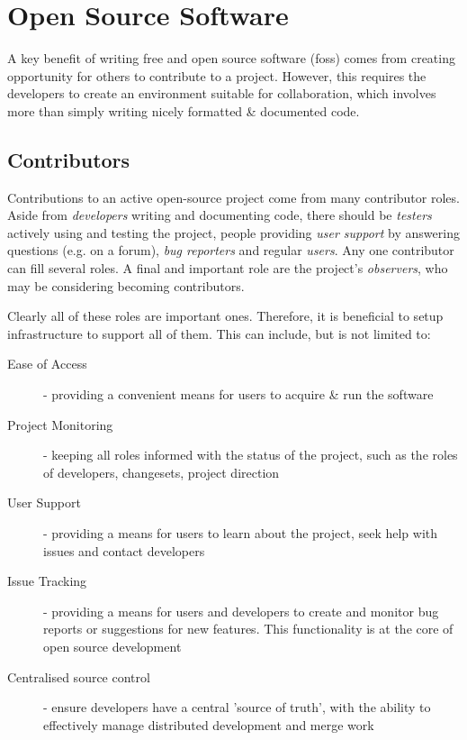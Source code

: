 \clearpage



\section{Open Source Software}

A key benefit of writing free and open source software (\gls{foss}) comes from creating opportunity for others to contribute to a project. However, this requires the developers to create an environment suitable for collaboration, which involves more than simply writing nicely formatted \& documented code.
\\

\subsection{Contributors}

Contributions to an active open-source project come from many contributor roles. Aside from \textit{developers} writing and documenting code, there should be \textit{testers} actively using and testing the project, people providing \textit{user support} by answering questions (e.g. on a forum), \textit{bug reporters} and regular \textit{users}. Any one contributor can fill several roles. A final and important role are the project's \textit{observers}, who may be considering becoming contributors.

Clearly all of these roles are important ones. Therefore, it is beneficial to setup infrastructure to support all of them. This can include, but is not limited to:
\begin{description}
	\item[Ease of Access] - providing a convenient means for users to acquire \& run the software
	\item[Project Monitoring] - keeping all roles informed with the status of the project, such as the roles of developers, changesets, project direction
	\item[User Support] - providing a means for users to learn about the project, seek help with issues and contact developers
	\item[Issue Tracking] - providing a means for users and developers to create and monitor bug reports or suggestions for new features. This functionality is at the core of open source development
	\item[Centralised source control] - ensure developers have a central 'source of truth', with the ability to effectively manage distributed development and merge work
\end{description}

